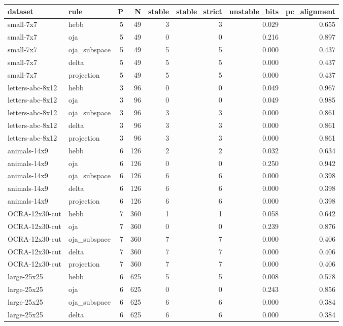 \begin{tabular}{llrrrrrr}
\toprule
dataset & rule & P & N & stable & stable\_strict & unstable\_bits & pc\_alignment \\
\midrule
small-7x7 & hebb & 5 & 49 & 3 & 3 & 0.029 & 0.655 \\
small-7x7 & oja & 5 & 49 & 0 & 0 & 0.216 & 0.897 \\
small-7x7 & oja\_subspace & 5 & 49 & 5 & 5 & 0.000 & 0.437 \\
small-7x7 & delta & 5 & 49 & 5 & 5 & 0.000 & 0.437 \\
small-7x7 & projection & 5 & 49 & 5 & 5 & 0.000 & 0.437 \\
letters-abc-8x12 & hebb & 3 & 96 & 0 & 0 & 0.049 & 0.967 \\
letters-abc-8x12 & oja & 3 & 96 & 0 & 0 & 0.049 & 0.985 \\
letters-abc-8x12 & oja\_subspace & 3 & 96 & 3 & 3 & 0.000 & 0.861 \\
letters-abc-8x12 & delta & 3 & 96 & 3 & 3 & 0.000 & 0.861 \\
letters-abc-8x12 & projection & 3 & 96 & 3 & 3 & 0.000 & 0.861 \\
animals-14x9 & hebb & 6 & 126 & 2 & 2 & 0.032 & 0.634 \\
animals-14x9 & oja & 6 & 126 & 0 & 0 & 0.250 & 0.942 \\
animals-14x9 & oja\_subspace & 6 & 126 & 6 & 6 & 0.000 & 0.398 \\
animals-14x9 & delta & 6 & 126 & 6 & 6 & 0.000 & 0.398 \\
animals-14x9 & projection & 6 & 126 & 6 & 6 & 0.000 & 0.398 \\
OCRA-12x30-cut & hebb & 7 & 360 & 1 & 1 & 0.058 & 0.642 \\
OCRA-12x30-cut & oja & 7 & 360 & 0 & 0 & 0.239 & 0.876 \\
OCRA-12x30-cut & oja\_subspace & 7 & 360 & 7 & 7 & 0.000 & 0.406 \\
OCRA-12x30-cut & delta & 7 & 360 & 7 & 7 & 0.000 & 0.406 \\
OCRA-12x30-cut & projection & 7 & 360 & 7 & 7 & 0.000 & 0.406 \\
large-25x25 & hebb & 6 & 625 & 5 & 5 & 0.008 & 0.578 \\
large-25x25 & oja & 6 & 625 & 0 & 0 & 0.243 & 0.856 \\
large-25x25 & oja\_subspace & 6 & 625 & 6 & 6 & 0.000 & 0.384 \\
large-25x25 & delta & 6 & 625 & 6 & 6 & 0.000 & 0.384 \\

\end{tabular}

